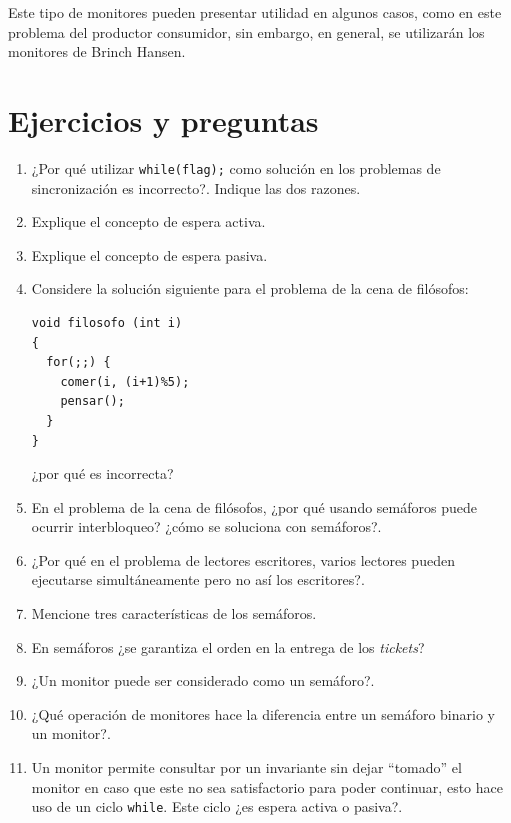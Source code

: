Este tipo de monitores pueden presentar utilidad en algunos casos, como en este
problema del productor consumidor, sin embargo, en general, se utilizarán los
monitores de Brinch Hansen.

\section{Ejercicios y preguntas}
\begin{enumerate}

\item ¿Por qué utilizar \texttt{while(flag);} como solución en los problemas de
sincronización es incorrecto?. Indique las dos razones.

\item Explique el concepto de espera activa.

\item Explique el concepto de espera pasiva.

\item Considere la solución siguiente para el problema de la cena de
filósofos:

\begin{lstlisting}
void filosofo (int i)
{
  for(;;) {
    comer(i, (i+1)%5);
    pensar();
  }
}
\end{lstlisting}

¿por qué es incorrecta?

\item En el problema de la cena de filósofos, ¿por qué usando semáforos puede
ocurrir interbloqueo? ¿cómo se soluciona con semáforos?.

\item ¿Por qué en el problema de lectores escritores, varios lectores
pueden ejecutarse simultáneamente pero no así los escritores?.

\item Mencione tres características de los semáforos.

\item En semáforos ¿se garantiza el orden en la entrega de los \emph{tickets}?

\item ¿Un monitor puede ser considerado como un semáforo?.

\item ¿Qué operación de monitores hace la diferencia entre un semáforo binario y
un monitor?.

\item Un monitor permite consultar por un invariante sin dejar ``tomado'' el
monitor en caso que este no sea satisfactorio para poder continuar, esto hace
uso de un ciclo \texttt{while}. Este ciclo ¿es espera activa o pasiva?.


\end{enumerate}
